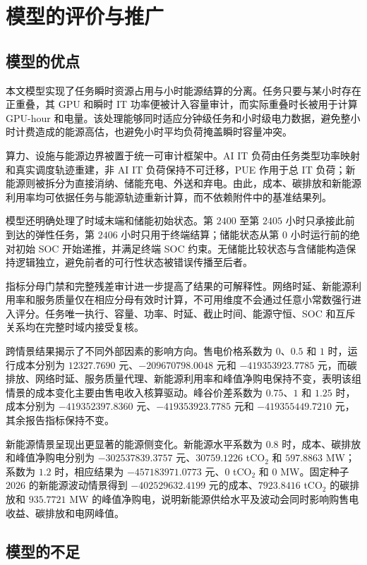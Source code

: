 \section{模型的评价与推广}

\subsection{模型的优点}

本文模型实现了任务瞬时资源占用与小时能源结算的分离。任务只要与某小时存在正重叠，其 GPU 和瞬时 IT 功率便被计入容量审计，而实际重叠时长被用于计算 GPU-hour 和电量。该处理能够同时适应分钟级任务和小时级电力数据，避免整小时计费造成的能源高估，也避免小时平均负荷掩盖瞬时容量冲突。

算力、设施与能源边界被置于统一可审计框架中。AI IT 负荷由任务类型功率映射和真实调度轨迹重建，非 AI IT 负荷保持不可迁移，PUE 作用于总 IT 负荷；新能源则被拆分为直接消纳、储能充电、外送和弃电。由此，成本、碳排放和新能源利用率均可依据任务与能源轨迹重新计算，而不依赖附件中的基准结果列。

模型还明确处理了时域末端和储能初始状态。第 $2400$ 至第 $2405$ 小时只承接此前到达的弹性任务，第 $2406$ 小时只用于终端结算；储能状态从第 $0$ 小时运行前的绝对初始 SOC 开始递推，并满足终端 SOC 约束。无储能比较状态与含储能构造保持逻辑独立，避免前者的可行性状态被错误传播至后者。

指标分母门禁和完整残差审计进一步提高了结果的可解释性。网络时延、新能源利用率和服务质量仅在相应分母有效时计算，不可用维度不会通过任意小常数强行进入评分。任务唯一执行、容量、功率、时延、截止时间、能源守恒、SOC 和互斥关系均在完整时域内接受复核。

跨情景结果揭示了不同外部因素的影响方向。售电价格系数为 $0$、$0.5$ 和 $1$ 时，运行成本分别为 $12327.7690$ 元、$-209670798.0048$ 元和 $-419353923.7785$ 元，而碳排放、网络时延、服务质量代理、新能源利用率和峰值净购电保持不变，表明该组情景的成本变化主要由售电收入核算驱动。峰谷价差系数为 $0.75$、$1$ 和 $1.25$ 时，成本分别为 $-419352397.8360$ 元、$-419353923.7785$ 元和 $-419355449.7210$ 元，其余报告指标保持不变。

新能源情景呈现出更显著的能源侧变化。新能源水平系数为 $0.8$ 时，成本、碳排放和峰值净购电分别为 $-302537839.3757$ 元、$30759.1226$ tCO$_2$ 和 $597.8863$ MW；系数为 $1.2$ 时，相应结果为 $-457183971.0773$ 元、$0$ tCO$_2$ 和 $0$ MW。固定种子 $2026$ 的新能源波动情景得到 $-402529632.4199$ 元的成本、$7923.8416$ tCO$_2$ 的碳排放和 $935.7721$ MW 的峰值净购电，说明新能源供给水平及波动会同时影响购售电收益、碳排放和电网峰值。

\subsection{模型的不足}

